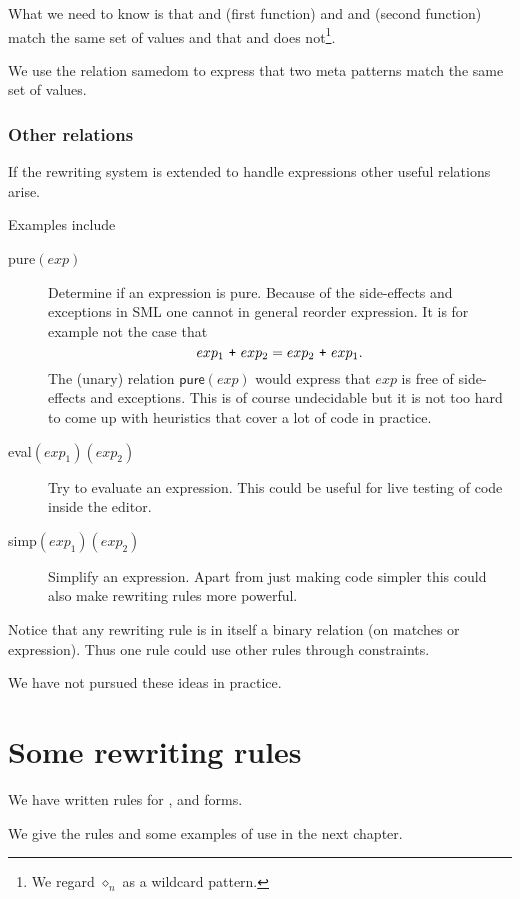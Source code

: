 What we need to know is that  and \ttt{_} (first
function) and \mbox{} and \mbox{}
(second function) match the same set of values and that
\mbox{} and \ttt{_} does not\footnote{We regard
  $\diamond_n$ as a wildcard pattern.}.

We use the relation \textsf{samedom} to express that two meta patterns match the
same set of values.

\subsubsection{Other relations}
If the rewriting system is extended to handle expressions other useful relations
arise.

Examples include
\begin{description}
\item[\textsf{pure}$(exp)$] Determine if an expression is pure. Because of the
  side-effects and exceptions in SML one cannot in general reorder
  expression. It is for example not the case that
  \[
  exp_1\ \ttt{+}\ exp_2 = exp_2\ \ttt{+}\ exp_1.
  \]
  The (unary) relation $\textsf{pure}(exp)$ would express that $exp$ is free of
  side-effects and exceptions. This is of course undecidable but it is not too
  hard to come up with heuristics that cover a lot of code in practice.
\item[\textsf{eval}$(exp_1)(exp_2)$] Try to evaluate an expression. This could be
  useful for live testing of code inside the editor.
\item[\textsf{simp}$(exp_1)(exp_2)$] Simplify an expression. Apart from just
  making code simpler this could also make rewriting rules more powerful.
\end{description}

Notice that any rewriting rule is in itself a binary relation (on matches or
expression). Thus one rule could use other rules through constraints.

We have not pursued these ideas in practice.

\section{Some rewriting rules}
We have written rules for ,  and  forms.

We give the rules and some examples of use in the next chapter.


